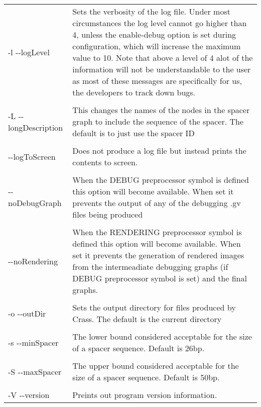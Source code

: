 \documentclass[11pt]{article} %
\begin{document}
\begin{longtable}{  l   p{10cm} }
-l -{}-logLevel & Sets the verbosity of the log file.  Under most circumstances the log level cannot go higher than 4, unless the enable-debug option is set during configuration, which will increase the maximum value to 10.  Note that above a level of 4 alot of the information will not be understandable to the user as most of these messages are specifically for us, the developers to track down bugs.  \\ \\
-L -{}-longDescription & This changes  the names of the nodes in the spacer graph to include the sequence of the spacer.  The default is to just use the spacer ID\\ \\
-{}-logToScreen & Does not produce a log file but instead prints the contents to screen.\\ \\
-{}-noDebugGraph & When the DEBUG preprocessor symbol is defined this option will become available.  When set it prevents the output of any of the debugging .gv files being produced \\ \\
-{}-noRendering & When the RENDERING preprocessor symbol is defined this option will become available.  When set it prevents the generation of rendered images from the intermeadiate debugging graphs (if DEBUG preprocessor symbol is set) and the final graphs.\\ \\
-o -{}-outDir & Sets the output directory for files produced by Crass.  The default is the current directory\\ \\
-s -{}-minSpacer & The lower bound considered acceptable for the size of a spacer sequence. Default is 26bp.\\ \\
-S -{}-maxSpacer & The upper bound considered acceptable for the size of a spacer sequence. Default is 50bp.\\ \\
-V -{}-version & Preints out program version information. \\
    \hline
 \end{longtable}
\end{document}
